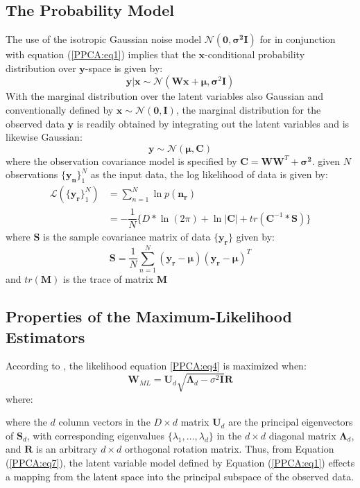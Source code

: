 \subsection{The Probability Model}
The use of the isotropic Gaussian noise model $\mathcal{N}(\pmb{0},\pmb{\sigma^2I})$ for   in conjunction with equation (\ref{PPCA:eq1}) implies that the $\pmb{x}$-conditional probability distribution over $\pmb{y}$-space is given by:
\begin{equation}
\label{PPCA:eq2}
\pmb{y|x} \sim \mathcal{N}(\pmb{Wx}+\pmb{\mu}, \pmb{\sigma}^2\pmb{I})
\end{equation}
With the marginal distribution over the latent variables also Gaussian and conventionally defined by $\pmb{x} \sim \mathcal{N}(\pmb{0},\pmb{I})$, the marginal distribution for the observed data $\pmb{y}$ is readily obtained by integrating out the latent variables and is likewise Gaussian:
\begin{equation}
\label{PPCA:eq3}
\pmb{y} \sim \mathcal{N}(\pmb{\mu},\pmb{C})
\end{equation}
where the observation covariance model is specified by $\pmb{C}=\pmb{WW}^T+\pmb{\sigma^2}$. given $N$ observations $\{\pmb{y_n}\}^N_1$ as the input data, the log likelihood of data is given by:
\begin{align}
\label{PPCA:eq4}
{\mathcal{L}(\{ \pmb{y_r}\}^N_1)} &= \sum_{n=1}^N \ln{p(\pmb{n_r})} \nonumber \\
&= -\dfrac{1}{N}\{D*\ln(2\pi) + \ln|\pmb{C}| + tr(\pmb{C}^{-1}*\pmb{S})\}
\end{align}
where $\pmb{S}$ is the sample covariance matrix of data $\pmb{\{y_r\}}$ given by:
\begin{equation}
\label{PPCA:eq5}
\pmb{S} = \dfrac{1}{N} \sum_{n=1}^N (\pmb{y_r - \mu})(\pmb{y_r - \mu})^T
\end{equation}
and $tr(\pmb{M})$ is the trace of matrix $\pmb{M}$

\subsection{Properties of the Maximum-Likelihood Estimators}
According to \cite{bishop}, the likelihood equation \ref{PPCA:eq4} is maximized when:
\begin{equation}
\label{PPCA:eq7}
\pmb{W}_{ML} = \pmb{U}_d \sqrt{\pmb{\Lambda}_d - \sigma^2\pmb{I}}\pmb{R}
\end{equation}
where:

where the $d$ column vectors in the $D \times d$ matrix $\pmb{U}_d$ are the principal eigenvectors of $\pmb{S}_d$, with corresponding eigenvalues $\{\lambda_1, \dots , \lambda_d\}$ in the $d \times d$ diagonal matrix $\pmb{\Lambda}_d$, and $\pmb{R}$ is an arbitrary $d \times d$ orthogonal rotation matrix. Thus, from Equation (\ref{PPCA:eq7}), the latent variable model defined by Equation (\ref{PPCA:eq1}) effects a mapping from the latent space into the principal subspace of the observed data.

